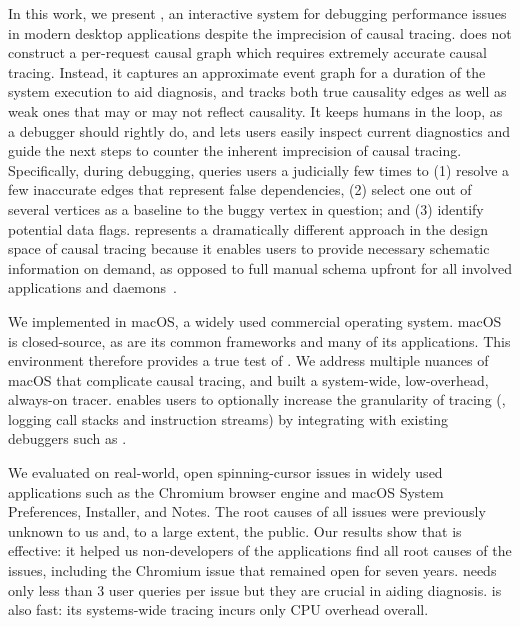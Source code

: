 In this work, we present \xxx, an interactive system for debugging
performance issues in modern desktop applications despite the imprecision
of causal tracing. \xxx does not construct a per-request causal graph
which requires extremely accurate causal tracing.  Instead, it captures an
approximate event graph for a duration of the system execution to aid
diagnosis, and tracks both true causality edges as well as weak ones that
may or may not reflect causality.  It keeps humans in the loop, as a
debugger should rightly do,
and lets users easily inspect current diagnostics and guide the next steps
to counter the inherent imprecision of causal tracing.  Specifically,
during debugging, \xxx queries users a judicially few times to (1) resolve
a few inaccurate edges that represent false dependencies, (2) select one
out of several vertices as a baseline to the buggy vertex in question; and
(3) identify potential data flags.  \xxx represents a dramatically
different approach in the design space of causal tracing because it
enables users to provide necessary schematic information on demand, as
opposed to full manual schema upfront for all involved applications and
daemons~\cite{barham2004using}.

We implemented \xxx in macOS, a widely used commercial operating
system. macOS is closed-source, as are its common frameworks and many of
its applications.  This environment therefore provides a true test of
\xxx.  We address multiple nuances of macOS that complicate causal
tracing, and built a system-wide, low-overhead, always-on tracer.  \xxx
enables users to optionally increase the granularity of tracing (\eg,
logging call stacks and instruction streams) by integrating with existing
debuggers such as .

We evaluated \xxx on \nbug real-world, open spinning-cursor issues in
widely used applications such as the Chromium browser engine and macOS
System Preferences, Installer, and Notes.  The root causes of all \nbug
issues were previously unknown to us and, to a large extent, the
public. Our results show that \xxx is effective: it helped us
non-developers of the applications find all root causes of the issues,
including the Chromium issue that remained open for seven years.  \xxx
needs only less than 3 user queries per issue but they are crucial in aiding
diagnosis. \xxx is also fast: its systems-wide tracing incurs only \cpuoverhead CPU
overhead overall.


